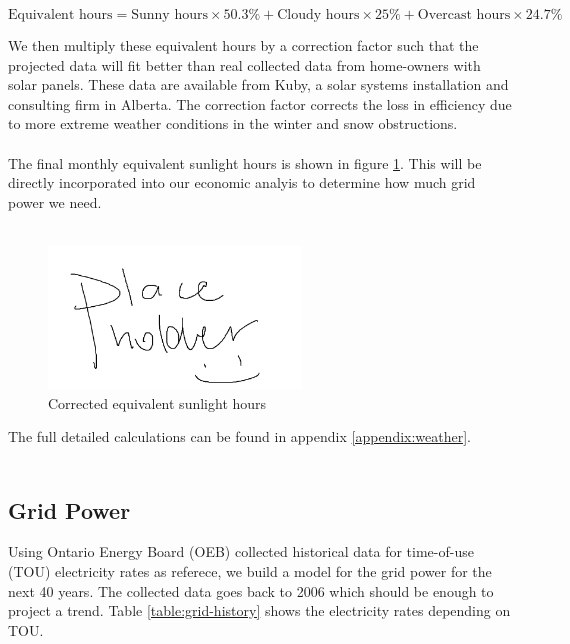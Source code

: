 \documentclass[10pt,letterpaper]{article}
\begin{document}
\begin{equation}
	\text{Equivalent hours}=\text{Sunny hours}\times50.3\%+\text{Cloudy hours}\times 25\% + \text{Overcast hours}\times 24.7\%
\end{equation}

We then multiply these equivalent hours by a correction factor such that the projected data will fit better than real collected data from home-owners with solar panels. These data are available from Kuby, a solar systems installation and consulting firm in Alberta\cite{kuby-complete-guide}. The correction factor corrects the loss in efficiency due to more extreme weather conditions in the winter and snow obstructions.\\
\\
The final monthly equivalent sunlight hours is shown in figure \ref{fig:weather-corrected}. This will be directly incorporated into our economic analyis to determine how much grid power we need.\\
\\
\begin{figure}[H]
	\centering
	\includegraphics[width=0.6\textwidth]{assets/placeholder}
	\caption{Corrected equivalent sunlight hours}
	\label{fig:weather-corrected}
\end{figure}

The full detailed calculations can be found in appendix \ref{appendix:weather}.\\
\\

\subsection{Grid Power}

Using Ontario Energy Board (OEB) collected historical data for time-of-use (TOU) electricity rates as referece, we build a model for the grid power for the next 40 years\cite{oeb}. The collected data goes back to 2006 which should be enough to project a trend. Table \ref{table:grid-history} shows the electricity rates depending on TOU.\\
\end{document}
